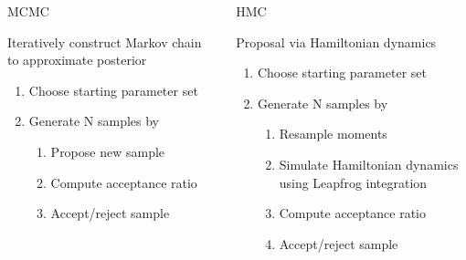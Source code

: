 \documentclass[12pt]{beamer}
\begin{document}
\begin{frame}

	\begin{columns}
		\begin{column}[t]{0.5\textwidth}

			\large
			MCMC
			\vspace{1.5\baselineskip}

			\normalsize
			Iteratively construct Markov chain to approximate posterior

			\vspace{0.5\baselineskip}

			\footnotesize
			\begin{enumerate}
				\item Choose starting parameter set
				\item Generate N samples by
				\begin{enumerate}
					\footnotesize
					\item Propose new sample
					\item Compute acceptance ratio
					\item Accept/reject sample
				\end{enumerate}
			\end{enumerate}

			
		\end{column}
		\begin{column}[t]{0.5\textwidth}

			\large
			HMC
			\vspace{1.5\baselineskip}

			\normalsize
			Proposal via Hamiltonian dynamics

			\vspace{1.5\baselineskip}

			\footnotesize
			\begin{enumerate}
				\item Choose starting parameter set
				\item Generate N samples by
				\begin{enumerate}
					\footnotesize
					\item Resample moments
					\item Simulate Hamiltonian dynamics using Leapfrog integration
					\item Compute acceptance ratio
					\item Accept/reject sample
				\end{enumerate}
			\end{enumerate}


		\end{column}
	\end{columns}

\end{frame}
\end{document}
